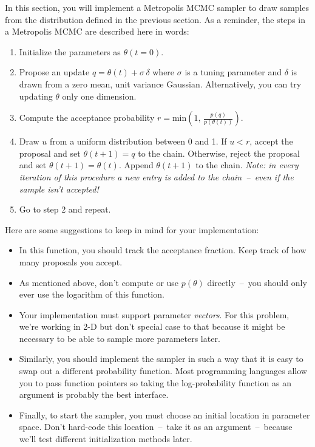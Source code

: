 \documentclass[letterpaper,12pt,preprint]{hack_aastex}
\begin{document}
In this section, you will implement a Metropolis MCMC sampler to draw samples
from the distribution defined in the previous section.
As a reminder, the steps in a Metropolis MCMC are described here in words:
\begin{enumerate}

\item Initialize the parameters as $\theta(t=0)$.

\item Propose an update $q = \theta(t) + \sigma\,\delta$ where $\sigma$ is a
tuning parameter and $\delta$ is drawn from a zero mean, unit variance
Gaussian. Alternatively, you can try updating $\theta$ only one dimension.

\item Compute the acceptance probability $r =
\mathrm{min}\left(1,\,\frac{p(q)}{p(\theta(t))}\right)$.

\item Draw $u$ from a uniform distribution between 0 and 1. If $u < r$, accept
the proposal and set $\theta(t+1) = q$ to the chain. Otherwise, reject the
proposal and set $\theta(t+1) = \theta(t)$. Append $\theta(t+1)$ to the chain.
\emph{Note: in every iteration of this procedure a new entry is added to the
chain~--~even if the sample isn't accepted!}

\item Go to step 2 and repeat.

\end{enumerate}
Here are some suggestions to keep in mind for your implementation:
\begin{itemize}

\item In this function, you should track the acceptance fraction.
Keep track of how many proposals you accept.

\item As mentioned above, don't compute or use $p(\theta)$ directly~--~you
should only ever use the logarithm of this function.

\item Your implementation must support parameter \emph{vectors}.
For this problem, we're working in 2-D but don't special case to that because
it might be necessary to be able to sample more parameters later.

\item Similarly, you should implement the sampler in such a way that it is
easy to swap out a different probability function. Most programming languages
allow you to pass function pointers so taking the log-probability function as
an argument is probably the best interface.

\item Finally, to start the sampler, you must choose an initial location in
parameter space. Don't hard-code this location~--~take it as an
argument~--~because we'll test different initialization methods later.

\end{itemize}
\end{document}
